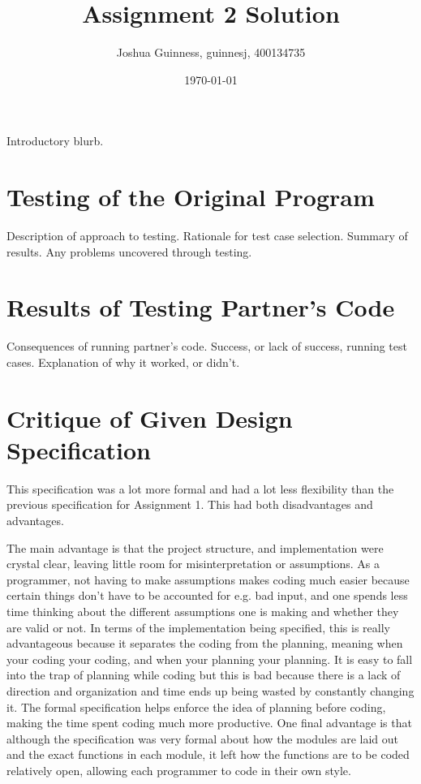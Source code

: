 \documentclass[12pt]{article}
\title{Assignment 2 Solution}
\author{Joshua Guinness, guinnesj, 400134735}
\date{\today}
\begin{document}
\maketitle

Introductory blurb.

\section{Testing of the Original Program}

Description of approach to testing.  Rationale for test case selection.  Summary
of results.  Any problems uncovered through testing.

\section{Results of Testing Partner's Code}

Consequences of running partner's code.  Success, or lack of success, running
test cases.  Explanation of why it worked, or didn't.

\section{Critique of Given Design Specification}

This specification was a lot more formal and had a lot less flexibility than
the previous specification for Assignment 1. This had both disadvantages and
advantages. 

The main advantage is that the project structure, and implementation were
crystal clear, leaving little room for misinterpretation or assumptions.
As a programmer, not having to make assumptions makes coding much easier 
because certain things don't have to be accounted for e.g. bad input, and
one spends less time thinking about the different assumptions one is 
making and whether they are valid or not. In terms of the implementation
being specified, this is really advantageous because it separates the coding
from the planning, meaning when your coding your coding, and when your
planning your planning. It is easy to fall into the trap of planning while
coding but this is bad because there is a lack of direction and organization
and time ends up being wasted by constantly changing it. The formal
specification helps enforce the idea of planning before coding, making the
time spent coding much more productive. One final advantage is that although
the specification was very formal about how the modules are laid out and the
exact functions in each module, it left how the functions are to be coded
relatively open, allowing each programmer to code in their own style.
\end{document}
